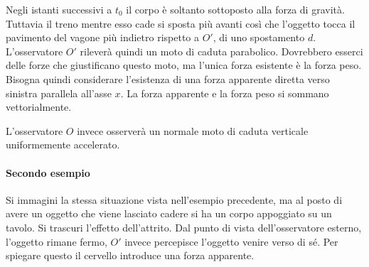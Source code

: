 Negli istanti successivi a $t_0$ il corpo è soltanto sottoposto alla forza di gravità. Tuttavia il treno mentre esso cade si sposta più avanti così che l'oggetto tocca il pavimento del vagone più indietro rispetto a $O'$, di uno spostamento $d$. L'osservatore $O'$ rileverà quindi un moto di caduta parabolico. Dovrebbero esserci delle forze che giustificano questo moto, ma l'unica forza esistente è la forza peso. Bisogna quindi considerare l'esistenza di una forza apparente diretta verso sinistra parallela all'asse $x$. La forza apparente e la forza peso si sommano vettorialmente.

L'osservatore $O$ invece osserverà un normale moto di caduta verticale uniformemente accelerato.

\paragraph{Secondo esempio} Si immagini la stessa situazione vista nell'esempio precedente, ma al posto di avere un oggetto che viene lasciato cadere si ha un corpo appoggiato su un tavolo. Si trascuri l'effetto dell'attrito. Dal punto di vista dell'osservatore esterno, l'oggetto rimane fermo, $O'$ invece percepisce l'oggetto venire verso di sé. Per spiegare questo il cervello introduce una forza apparente.

